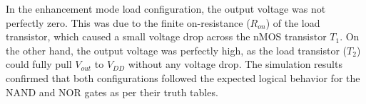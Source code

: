 \documentclass[a4paper,12pt]{article}
\begin{document}
	
	In the enhancement mode load configuration, the output voltage was not perfectly zero. This was due to the finite on-resistance (\( R_{on} \)) of the load transistor, which caused a small voltage drop across the nMOS transistor \( T_1 \). On the other hand, the output voltage was perfectly high, as the load transistor (\( T_2 \)) could fully pull \( V_{out} \) to \( V_{DD} \) without any voltage drop. The simulation results confirmed that both configurations followed the expected logical behavior for the NAND and NOR gates as per their truth tables.
	
	
\end{document}
